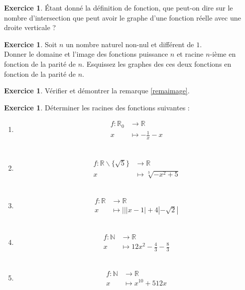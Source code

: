 \documentclass[a4paper,13pt]{scrreprt}
\theoremstyle{plain}
\theoremstyle{definition}
\newtheorem{exo}[subsection]{Exercice}
\newcommand{\nn}{\mathbb{N}}
\newcommand{\rr}{\mathbb{R}}
\begin{document}
\begin{exo} \label{exof8}
	\'Etant donné la définition de fonction, que peut-on dire sur le nombre d'intersection que peut avoir le graphe d'une fonction réelle avec une droite verticale ?
\end{exo}

\begin{exo} \label{exof9}
	Soit $n$ un nombre naturel non-nul et différent de $1$. \\
	Donner le domaine et l'image des fonctions puissance $n$ et racine $n$-ième en fonction de la parité de $n$. Esquissez les graphes des ces deux fonctions en fonction de la parité de $n$.
\end{exo}

\begin{exo} \label{exof10}
	Vérifier et démontrer la remarque \ref{remaimage}.
\end{exo}
\newpage
\begin{exo} \label{exof10a}
	Déterminer les racines des fonctions suivantes : \\
	\begin{enumerate}
		\item \begin{align*}
		f : {\rr}_{0} &\to \rr \\
		x &\mapsto -\frac{1}{x} - x
		\end{align*} \\
		\item \begin{align*}
		f : {\rr} \backslash \{\sqrt{5}\} &\to \rr \\
		x &\mapsto \sqrt[3]{-x^2+5}
		\end{align*} \\
		\item \begin{align*}
		f : \rr &\to \rr \\
		x &\mapsto |||x-1|+4|-\sqrt{2}|
		\end{align*} \\
		\item \begin{align*}
		f : \nn &\to \rr \\
		x &\mapsto 12x^2 - \frac{4}{3} - \frac{8}{3}
		\end{align*} \\
		\item \begin{align*}
		f : \nn &\to \rr \\
		x &\mapsto x^{10}+512x
		\end{align*}
	\end{enumerate}
\end{exo}
\end{document}
